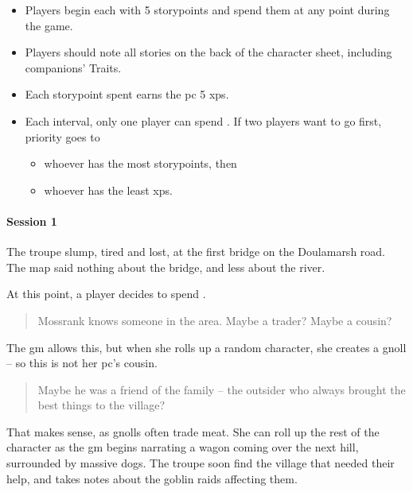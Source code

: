 \begin{multicols}{2}

\begin{itemize}
  \item
  Players begin each with 5 \glspl{storypoint} and spend them at any point during the game.
  \item
  Players should note all stories on the back of the character sheet, including companions' Traits.
  \item
  Each \gls{storypoint} spent earns the \gls{pc} 5 \glspl{xp}.
  \item
  Each \gls{interval}, only one player can spend .
  If two players want to go first, priority goes to
  \begin{itemize}
    \item
    whoever has the most \glspl{storypoint}, then
    \item
    whoever has the least \glspl{xp}.
  \end{itemize}
\end{itemize}

\begin{exampletext}
  \paragraph{Session 1}
  The troupe slump, tired and lost, at the first bridge on the Doulamarsh road.
  The map said nothing about the bridge, and less about the river.

  At this point, a player decides to spend .

  \begin{quotation}
    Mossrank knows someone in the area.
    Maybe a trader?
    Maybe a cousin?
  \end{quotation}

  The \gls{gm} allows this, but when she rolls up a random character, she creates a gnoll -- so this is not her \gls{pc}'s cousin.

  \begin{quotation}
    Maybe he was a friend of the family -- the outsider who always brought the best things to the \gls{village}?
  \end{quotation}

  That makes sense, as gnolls often trade meat.
  She can roll up the rest of the character as the \gls{gm} begins narrating a wagon coming over the next hill, surrounded by massive dogs.
  The troupe soon find the \gls{village} that needed their help, and takes notes about the goblin raids affecting them.


\end{exampletext}
\end{multicols}
